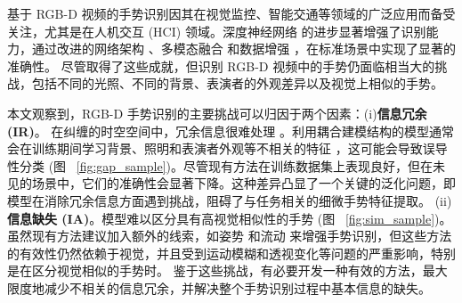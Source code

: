 基于 RGB-D 视频的手势识别因其在视觉监控、智能交通等领域的广泛应用而备受关注，尤其是在人机交互 (HCI) \cite{yu2021searching} 领域。深度神经网络 \cite{zhou2023unified,li2021trear} 的进步显著增强了识别能力，通过改进的网络架构 \cite{zhu2019redundancy,zhu2018continuous,zhou2022decoupling}、多模态融合 \cite{li2021trear,narayana2018focus,yu2021searching} 和数据增强 \cite{li2021trear,zuo2023natural}，在标准场景中实现了显著的准确性。
尽管取得了这些成就，但识别 RGB-D 视频中的手势仍面临相当大的挑战，包括不同的光照、不同的背景、表演者的外观差异以及视觉上相似的手势。

本文观察到，RGB-D 手势识别的主要挑战可以归因于两个因素：(i)\textbf{信息冗余 (IR)}。
在纠缠的时空空间中，冗余信息很难处理 \cite{zhou2023unified, LI2024110536}。利用耦合建模结构的模型通常会在训练期间学习背景、照明和表演者外观等不相关的特征 \cite{zhou2023unified}，这可能会导致误导性分类 (图 ~\ref{fig:gap_sample})。尽管现有方法在训练数据集上表现良好，但在未见的场景中，它们的准确性会显著下降。这种差异凸显了一个关键的泛化问题，即模型在消除冗余信息方面遇到挑战，阻碍了与任务相关的细微手势特征提取。
(ii)\textbf{信息缺失 (IA)}。模型难以区分具有高视觉相似性的手势 (图 ~\ref{fig:sim_sample})。虽然现有方法建议加入额外的线索，如姿势 \cite{wan2016chalearn,zuo2023natural} 和流动 \cite{narayana2018focus} 来增强手势识别，但这些方法的有效性仍然依赖于视觉，并且受到运动模糊和透视变化等问题的严重影响，特别是在区分视觉相似的手势时。
鉴于这些挑战，有必要开发一种有效的方法，最大限度地减少不相关的信息冗余，并解决整个手势识别过程中基本信息的缺失。

